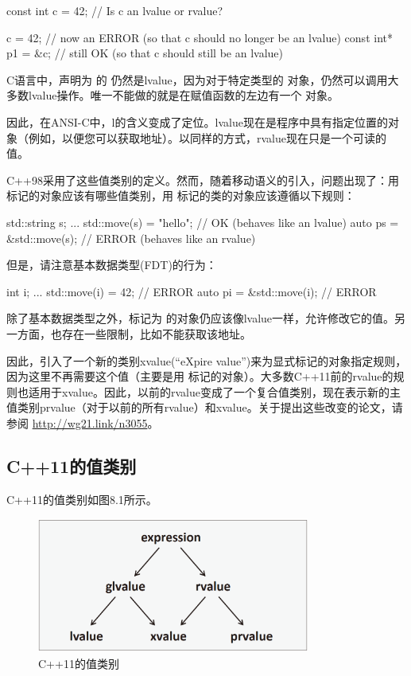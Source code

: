 \begin{cppcode}
const int c = 42; // Is c an lvalue or rvalue?

c = 42; // now an ERROR (so that c should no longer be an lvalue)
const int* p1 = &c; // still OK (so that c should still be an lvalue)
\end{cppcode}

C语言中，声明为  的  仍然是lvalue，因为对于特定类型的  对象，仍然可以调用大多数lvalue操作。唯一不能做的就是在赋值函数的左边有一个  对象。

因此，在ANSI-C中，l的含义变成了定位。lvalue现在是程序中具有指定位置的对象（例如，以便您可以获取地址）。以同样的方式，rvalue现在只是一个可读的值。

C++98采用了这些值类别的定义。然而，随着移动语义的引入，问题出现了：用  标记的对象应该有哪些值类别，用  标记的类的对象应该遵循以下规则：

\begin{cppcode}
std::string s;
...
std::move(s) = "hello"; // OK (behaves like an lvalue)
auto ps = &std::move(s); // ERROR (behaves like an rvalue)
\end{cppcode}

但是，请注意基本数据类型(FDT)的行为：

\begin{cppcode}
int i;
...
std::move(i) = 42; // ERROR
auto pi = &std::move(i); // ERROR
\end{cppcode}

除了基本数据类型之外，标记为  的对象仍应该像lvalue一样，允许修改它的值。另一方面，也存在一些限制，比如不能获取该地址。

因此，引入了一个新的类别xvalue(“eXpire value”)来为显式标记的对象指定规则，因为这里不再需要这个值（主要是用  标记的对象）。大多数C++11前的rvalue的规则也适用于xvalue。因此，以前的rvalue变成了一个复合值类别，现在表示新的主值类别prvalue（对于以前的所有rvalue）和xvalue。关于提出这些改变的论文，请参阅 \url{http://wg21.link/n3055}。

\subsection{C++11的值类别}

C++11的值类别如图8.1所示。

\begin{figure}
	\includegraphics[width=0.8\textwidth]{part1/ch8/images/1}
	\caption{C++11的值类别}
\end{figure}

